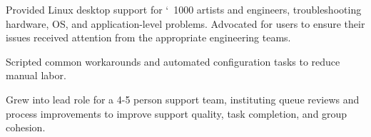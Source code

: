   \cventry
  {
  }
  {}
  {}
  {}
  {
    \begin{cvitems}
    \item Provided Linux desktop support for \char`~1000 artists and engineers, troubleshooting hardware, OS, and application-level problems.
      Advocated for users to ensure their issues received attention from the appropriate engineering teams.
    \item Scripted common workarounds and automated configuration tasks to reduce manual labor.
    \item Grew into lead role for a 4-5 person support team, instituting queue reviews and process improvements to improve support quality, task completion, and group cohesion.
    \end{cvitems}
  }

\vspace{\acvSectionContentTopSkip}
